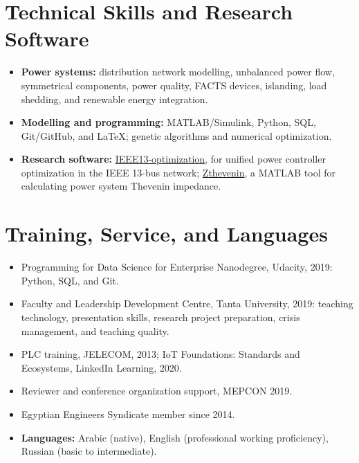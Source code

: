 \documentclass[10pt,a4paper]{article}
\begin{document}
\section*{Technical Skills and Research Software}
\begin{itemize}
\item \textbf{Power systems:} distribution network modelling, unbalanced power flow, symmetrical components, power quality, FACTS devices, islanding, load shedding, and renewable energy integration.
\item \textbf{Modelling and programming:} MATLAB/Simulink, Python, SQL, Git/GitHub, and LaTeX; genetic algorithms and numerical optimization.
\item \textbf{Research software:} \href{https://github.com/ahmelkholy/IEEE13-optimization}{IEEE13-optimization}, for unified power controller optimization in the IEEE 13-bus network; \href{https://github.com/ahmelkholy/Zthevenin}{Zthevenin}, a MATLAB tool for calculating power system Thevenin impedance.
\end{itemize}
\section*{Training, Service, and Languages}
\begin{itemize}
\item Programming for Data Science for Enterprise Nanodegree, Udacity, 2019: Python, SQL, and Git.
\item Faculty and Leadership Development Centre, Tanta University, 2019: teaching technology, presentation skills, research project preparation, crisis management, and teaching quality.
\item PLC training, JELECOM, 2013; IoT Foundations: Standards and Ecosystems, LinkedIn Learning, 2020.
\item Reviewer and conference organization support, MEPCON 2019.
\item Egyptian Engineers Syndicate member since 2014.
\item \textbf{Languages:} Arabic (native), English (professional working proficiency), Russian (basic to intermediate).
\end{itemize}
\newpage
\end{document}
